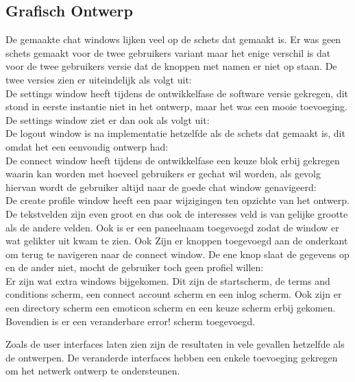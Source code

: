 \documentclass[12pt]{article}
\begin{document}
\subsection{Grafisch Ontwerp}
De gemaakte chat windows lijken veel op de schets dat gemaakt is. Er was geen schets gemaakt voor de twee gebruikers variant maar het enige verschil is dat voor de twee gebruikers versie dat de knoppen met namen er niet op staan. De twee versies zien er uiteindelijk als volgt uit:
\\

\noindent De settings window heeft tijdens de ontwikkelfase de software versie gekregen, dit stond in eerste instantie niet in het ontwerp, maar het was een mooie toevoeging. De settings window ziet er dan ook als volgt uit:
\\

\noindent De logout window is na implementatie hetzelfde als de schets dat gemaakt is, dit omdat het een eenvoudig ontwerp had:
\\

\noindent De connect window heeft tijdens de ontwikkelfase een keuze blok erbij gekregen waarin kan worden met hoeveel gebruikers er gechat wil worden, als gevolg hiervan wordt de gebruiker altijd naar de goede chat window genavigeerd:
\\

\noindent De create profile window heeft een paar wijzigingen ten opzichte van het ontwerp. De tekstvelden zijn even groot en dus ook de interesses veld is van gelijke grootte als de andere velden. Ook is er een paneelnaam toegevoegd zodat de window er wat gelikter uit kwam te zien. Ook Zijn er knoppen toegevoegd aan de onderkant om terug te navigeren naar de connect window. De ene knop slaat de gegevens op en de ander niet, mocht de gebruiker toch geen profiel willen:
\\

\noindent Er zijn wat extra windows bijgekomen. Dit zijn de startscherm, de terms and conditions scherm,  een connect account scherm en een inlog scherm. Ook zijn er een directory scherm een emoticon scherm en een keuze scherm erbij gekomen. Bovendien is er een veranderbare error! scherm toegevoegd.


\noindent Zoals de user interfaces laten zien zijn de resultaten in vele gevallen hetzelfde als de ontwerpen. De veranderde interfaces hebben een enkele toevoeging gekregen om het netwerk ontwerp te ondersteunen.
\newpage
\end{document}
